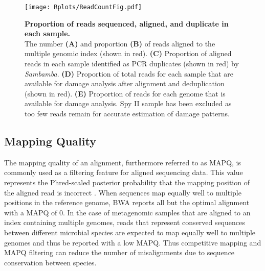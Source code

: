 \documentclass[12pt, a4paper]{article}
\begin{document}
\begin{figure}[h]
	\begin{center}
	\texttt{[image: Rplots/ReadCountFig.pdf]}
	\end{center}
	\caption[Proportion of reads sequenced, aligned, and duplicate in each sample]{\textbf{Proportion of reads sequenced, aligned, and duplicate in each sample.}\\ \small The number \textbf{(A)} and proportion \textbf{(B)} of reads aligned to the multiple genomic index (shown in red). \textbf{(C)} Proportion of aligned reads in each sample identified as PCR duplicates (shown in red) by \textit{Sambamba}. \textbf{(D)} Proportion of total reads for each sample that are available for damage analysis after alignment and deduplication (shown in red). \textbf{(E)} Proportion of reads for each genome that is available for damage analysis. Spy II sample has been excluded as too few reads remain for accurate estimation of damage patterns.}\label{fig:readCountFig}
\end{figure}
\clearpage

\subsection{Mapping Quality}\label{sssec:MAPQ}

The mapping quality of an alignment, furthermore referred to as MAPQ, is commonly used as a filtering feature for aligned sequencing data. 
This value represents the Phred-scaled posterior probability that the mapping position of the aligned read is incorrect \cite{Li:2009aa}. 
When sequences map equally well to multiple positions in the reference genome, BWA reports all but the optimal alignment with a MAPQ of 0. 
In the case of metagenomic samples that are aligned to an index containing multiple genomes, reads that represent conserved sequences between different microbial species are expected to map equally well to multiple genomes and thus be reported with a low MAPQ. 
Thus competitive mapping and MAPQ filtering can reduce the number of misalignments due to sequence conservation between species.
\end{document}

